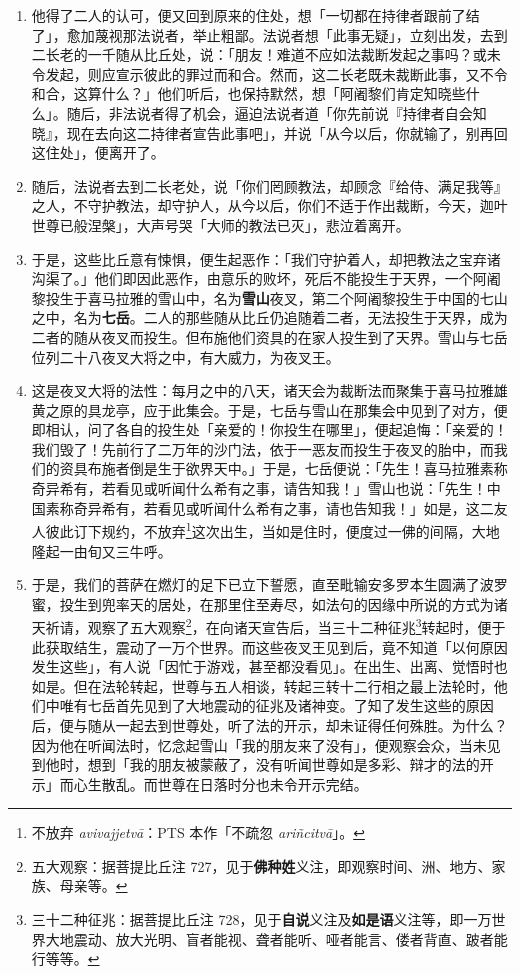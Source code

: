 \begin{enumerate}
\item 他得了二人的认可，便又回到原来的住处，想「一切都在持律者跟前了结了」，愈加蔑视那法说者，举止粗鄙。法说者想「此事无疑」，立刻出发，去到二长老的一千随从比丘处，说：「朋友！难道不应如法裁断发起之事吗？或未令发起，则应宣示彼此的罪过而和合。然而，这二长老既未裁断此事，又不令和合，这算什么？」他们听后，也保持默然，想「阿阇黎们肯定知晓些什么」。随后，非法说者得了机会，逼迫法说者道「你先前说『持律者自会知晓』，现在去向这二持律者宣告此事吧」，并说「从今以后，你就输了，别再回这住处」，便离开了。
\item 随后，法说者去到二长老处，说「你们罔顾教法，却顾念『给侍、满足我等』之人，不守护教法，却守护人，从今以后，你们不适于作出裁断，今天，迦叶世尊已般涅槃」，大声号哭「大师的教法已灭」，悲泣着离开。
\item 于是，这些比丘意有悚惧，便生起恶作：「我们守护着人，却把教法之宝弃诸沟渠了。」他们即因此恶作，由意乐的败坏，死后不能投生于天界，一个阿阇黎投生于喜马拉雅的雪山中，名为\textbf{雪山}夜叉，第二个阿阇黎投生于中国的七山之中，名为\textbf{七岳}。二人的那些随从比丘仍追随着二者，无法投生于天界，成为二者的随从夜叉而投生。但布施他们资具的在家人投生到了天界。雪山与七岳位列二十八夜叉大将之中，有大威力，为夜叉王。
\item 这是夜叉大将的法性：每月之中的八天，诸天会为裁断法而聚集于喜马拉雅雄黄之原的具龙亭，应于此集会。于是，七岳与雪山在那集会中见到了对方，便即相认，问了各自的投生处「亲爱的！你投生在哪里」，便起追悔：「亲爱的！我们毁了！先前行了二万年的沙门法，依于一恶友而投生于夜叉的胎中，而我们的资具布施者倒是生于欲界天中。」于是，七岳便说：「先生！喜马拉雅素称奇异希有，若看见或听闻什么希有之事，请告知我！」雪山也说：「先生！中国素称奇异希有，若看见或听闻什么希有之事，请也告知我！」如是，这二友人彼此订下规约，不放弃\footnote{不放弃 \textit{avivajjetvā}：PTS 本作「不疏忽 \textit{ariñcitvā}」。}这次出生，当如是住时，便度过一佛的间隔，大地隆起一由旬又三牛呼。
\item 于是，我们的菩萨在燃灯的足下已立下誓愿，直至毗输安多罗本生圆满了波罗蜜，投生到兜率天的居处，在那里住至寿尽，如法句的因缘中所说的方式为诸天祈请，观察了五大观察\footnote{五大观察：据菩提比丘注 727，见于\textbf{佛种姓}义注，即观察时间、洲、地方、家族、母亲等。}，在向诸天宣告后，当三十二种征兆\footnote{三十二种征兆：据菩提比丘注 728，见于\textbf{自说}义注及\textbf{如是语}义注等，即一万世界大地震动、放大光明、盲者能视、聋者能听、哑者能言、偻者背直、跛者能行等等。}转起时，便于此获取结生，震动了一万个世界。而这些夜叉王见到后，竟不知道「以何原因发生这些」，有人说「因忙于游戏，甚至都没看见」。在出生、出离、觉悟时也如是。但在法轮转起，世尊与五人相谈，转起三转十二行相之最上法轮时，他们中唯有七岳首先见到了大地震动的征兆及诸神变。了知了发生这些的原因后，便与随从一起去到世尊处，听了法的开示，却未证得任何殊胜。为什么？因为他在听闻法时，忆念起雪山「我的朋友来了没有」，便观察会众，当未见到他时，想到「我的朋友被蒙蔽了，没有听闻世尊如是多彩、辩才的法的开示」而心生散乱。而世尊在日落时分也未令开示完结。

\end{enumerate}
